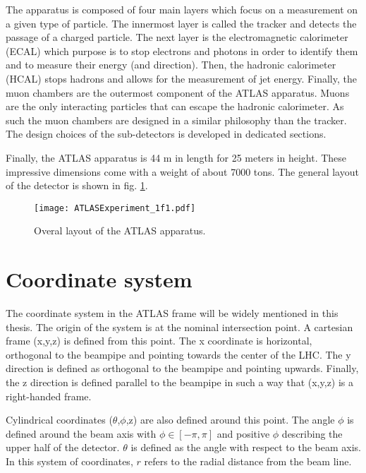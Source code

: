 The apparatus is composed of four main layers which focus on a measurement on a given type of particle.
The innermost layer is called the tracker and detects the passage of a charged particle.
The next layer is the electromagnetic calorimeter (ECAL) which purpose is to stop electrons and photons in order to identify them and to measure their energy (and direction).
Then, the hadronic calorimeter (HCAL) stops hadrons and allows for the measurement of jet energy.
Finally, the muon chambers are the outermost component of the ATLAS apparatus.
Muons are the only interacting particles that can escape the hadronic calorimeter.
As such the muon chambers are designed in a similar philosophy than the tracker.
The design choices of the sub-detectors is developed in dedicated sections.


Finally, the ATLAS apparatus is 44 m in length for 25 meters in height.
These impressive dimensions come with a weight of about 7000 tons.
The general layout of the detector is shown in fig. \ref{fig:org760cc96}.

\begin{figure}[htbp]
\centering
\texttt{[image: ATLASExperiment\_1f1.pdf]}
\caption{\label{fig:org760cc96}
Overal layout of the ATLAS apparatus.\cite{ATLASExperiment}}
\end{figure}

\section{Coordinate system}
\label{sec:orgfd01f9e}

The coordinate system in the ATLAS frame will be widely mentioned in this thesis.
The origin of the system is at the nominal intersection point.
A cartesian frame (x,y,z) is defined from this point.
The x coordinate is horizontal, orthogonal to the beampipe and pointing towards the center of the LHC.
The y direction is defined as orthogonal to the beampipe and pointing upwards.
Finally, the z direction is defined parallel to the beampipe in such a way that (x,y,z) is a right-handed frame.

Cylindrical coordinates (\(\theta\),$\phi$,z) are also defined around this point.
The  angle $\phi$ is defined around the beam axis with \(\phi\in[-\pi, \pi]\) and positive $\phi$ describing the upper half of the detector.
\(\theta\) is defined as the angle with respect to the beam axis.
In this system of coordinates, $r$ refers to the radial distance from the beam line.

